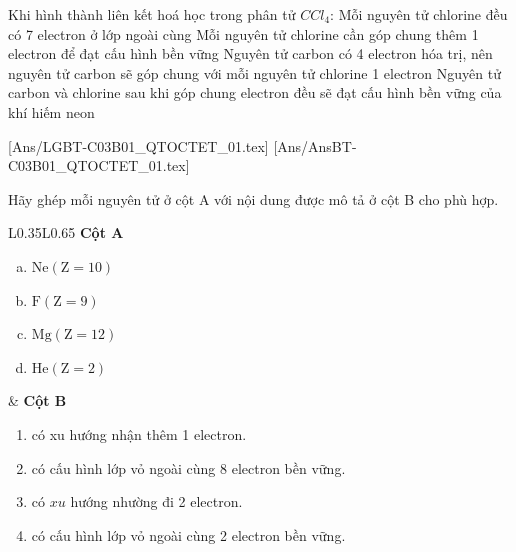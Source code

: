 \begin{ex}
	Khi hình thành liên kết hoá học trong phân tử $CCl_4$:
	\choiceTF
	{\True Mỗi nguyên tử chlorine đều có 7 electron ở lớp ngoài cùng}
	{\True Mỗi nguyên tử chlorine cần góp chung thêm 1 electron để đạt cấu hình bền vững}
	{\True Nguyên tử carbon có 4 electron hóa trị, nên nguyên tử carbon sẽ góp chung với mỗi nguyên tử chlorine 1 electron}
	{Nguyên tử carbon và chlorine sau khi góp chung electron đều sẽ đạt cấu hình bền vững của khí hiếm neon}
	\loigiai{}
\end{ex}
[Ans/LGBT-C03B01_QTOCTET_01.tex]
[Ans/AnsBT-C03B01_QTOCTET_01.tex]
	\begin{bt}
		Hãy ghép mỗi nguyên tử ở cột A với nội dung được mô tả ở cột B cho phù hợp.
		\\
		\begin{tabular}{L{0.35\linewidth}L{0.65\linewidth}}
			\textbf{Cột A}
			\begin{enumerate}[a)]
				\item $\mathrm{Ne}(\mathrm{Z}=10)$
				\item $\mathrm{F}(\mathrm{Z}=9)$
				\item $\mathrm{Mg}(\mathrm{Z}=12)$
				\item $\mathrm{He}(\mathrm{Z}=2)$
			\end{enumerate}
			&
			\textbf{Cột B}
			\begin{enumerate}[1.]
				\item có xu hướng nhận thêm 1 electron.
				\item có cấu hình lớp vỏ ngoài cùng 8 electron bền vững.
				\item có $x u$ hướng nhường đi 2 electron.
				\item có cấu hình lớp vỏ ngoài cùng 2 electron bền vững.
			\end{enumerate}\\
		\end{tabular}
	\end{bt}
